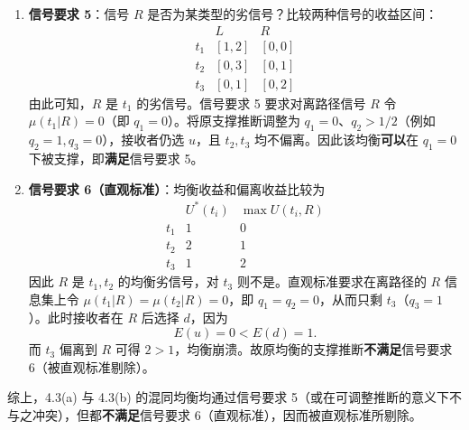 \begin{enumerate}[leftmargin=1.6em]
  \item \textbf{信号要求 5}：信号 $R$ 是否为某类型的劣信号？比较两种信号的收益区间：
    \[
      \begin{array}{c|cc}
        & L & R\\ \hline
        t_1 & [1,2] & [0,0]\\
        t_2 & [0,3] & [0,1]\\
        t_3 & [0,1] & [0,2]
      \end{array}
    \]
    \indent 由此可知，$R$ 是 $t_1$ 的劣信号。信号要求 5 要求对离路径信号 $R$ 令 $\mu(t_1|R)=0$（即 $q_1=0$）。将原支撑推断调整为 $q_1=0$、$q_2>1/2$（例如 $q_2=1,q_3=0$），接收者仍选 $u$，且 $t_2,t_3$ 均不偏离。因此该均衡\textbf{可以}在 $q_1=0$ 下被支撑，即\textbf{满足}信号要求 5。
  \item \textbf{信号要求 6（直观标准）}：均衡收益和偏离收益比较为
    \[
      \begin{array}{c|cc}
        & U^*(t_i) & \max U(t_i,R)\\ \hline
        t_1 & 1 & 0\\
        t_2 & 2 & 1\\
        t_3 & 1 & 2
      \end{array}
    \]
    \indent 因此 $R$ 是 $t_1,t_2$ 的均衡劣信号，对 $t_3$ 则不是。直观标准要求在离路径的 $R$ 信息集上令 $\mu(t_1|R)=\mu(t_2|R)=0$，即 $q_1=q_2=0$，从而只剩 $t_3$（$q_3=1$）。此时接收者在 $R$ 后选择 $d$，因为
    \[
      E(u)=0<E(d)=1.
    \]
    \indent 而 $t_3$ 偏离到 $R$ 可得 $2>1$，均衡崩溃。故原均衡的支撑推断\textbf{不满足}信号要求 6（被直观标准剔除）。
\end{enumerate}

\noindent 综上，4.3(a) 与 4.3(b) 的混同均衡均通过信号要求 5（或在可调整推断的意义下不与之冲突），但都\textbf{不满足}信号要求 6（直观标准），因而被直观标准所剔除。
